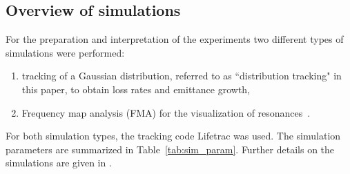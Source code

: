 \documentclass[%
 reprint,
 amsmath,amssymb,
 aps,
prstab,
]{revtex4-1}
\begin{document}
\subsection{Overview of simulations\label{sec:sim}}
For the preparation and interpretation of the experiments two different types of simulations were performed:
\begin{enumerate}
	\item tracking of a Gaussian distribution, referred to as ``distribution tracking" in this paper, to obtain loss rates and emittance growth,
	\item Frequency map analysis (FMA) for the visualization of resonances~\cite{fmalaskar}.
\end{enumerate}
For both simulation types, the tracking code Lifetrac \cite{lifetrac} was used. The simulation parameters are summarized in Table~\ref{tab:sim_param}. Further details on the simulations are given in \cite{md_sim_hel_res_ex_fitterer,resexmd2017}.
\end{document}
